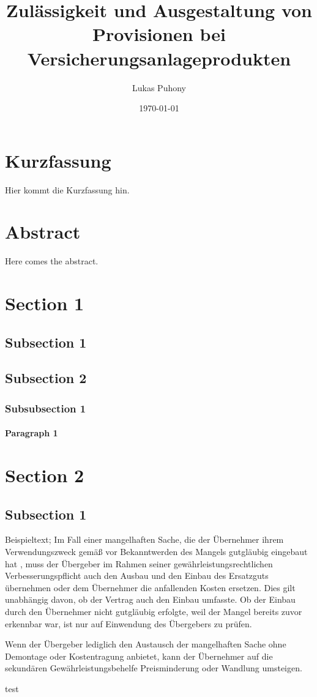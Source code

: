 \documentclass[a4paper, 12pt]{article}
\title{Zulässigkeit und Ausgestaltung von Provisionen bei Versicherungsanlageprodukten}
\author{Lukas Puhony}
\date{\today}
\begin{document}


\section*{Kurzfassung}

Hier kommt die Kurzfassung hin.

\newpage

\section*{Abstract}

Here comes the abstract.

\newpage
{}

\tableofcontents
\newpage

\section{Section 1}
\subsection{Subsection 1}
\subsection{Subsection 2}
\subsubsection{Subsubsection 1}
\paragraph{Paragraph 1}

\section{Section 2}
\subsection{Subsection 1}

Beispieltext; Im Fall einer mangelhaften Sache, die der Übernehmer ihrem Verwendungszweck gemäß vor Bekanntwerden des Mangels gutgläubig eingebaut hat , muss der Übergeber im Rahmen seiner gewährleistungsrechtlichen Verbesserungspflicht  auch den Ausbau und den Einbau des Ersatzguts übernehmen oder dem Übernehmer die anfallenden Kosten ersetzen. Dies gilt unabhängig davon, ob der Vertrag auch den Einbau umfasste. Ob der Einbau durch den Übernehmer nicht gutgläubig erfolgte, weil der Mangel bereits zuvor erkennbar war, ist nur auf Einwendung des Übergebers zu prüfen.

Wenn der Übergeber lediglich den Austausch der mangelhaften Sache ohne Demontage oder Kostentragung anbietet, kann der Übernehmer auf die sekundären Gewährleistungsbehelfe Preisminderung oder Wandlung umsteigen.

test
\end{document}
